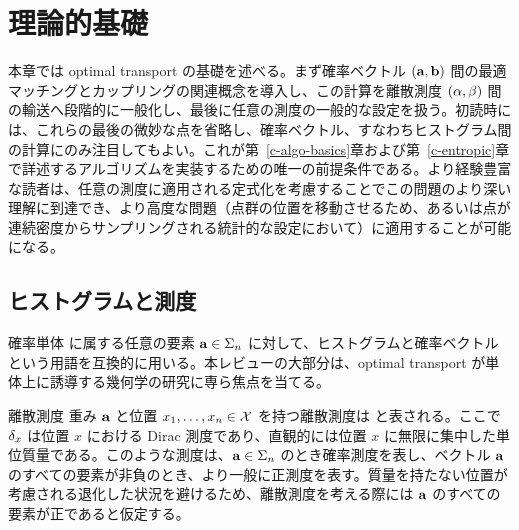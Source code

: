\chapter{理論的基礎}
\label{c-continuous}

本章では optimal transport の基礎を述べる。まず確率ベクトル $(\mathrm{\textbf{a}},\mathrm{\textbf{b}})$ 間の最適マッチングとカップリングの関連概念を導入し、この計算を離散測度 $(\alpha,\beta)$ 間の輸送へ段階的に一般化し、最後に任意の測度の一般的な設定を扱う。初読時には、これらの最後の微妙な点を省略し、確率ベクトル、すなわちヒストグラム間の計算にのみ注目してもよい。これが第~\ref{c-algo-basics}章および第~\ref{c-entropic}章で詳述するアルゴリズムを実装するための唯一の前提条件である。より経験豊富な読者は、任意の測度に適用される定式化を考慮することでこの問題のより深い理解に到達でき、より高度な問題（\eg 点群の位置を移動させるため、あるいは点が連続密度からサンプリングされる統計的な設定において）に適用することが可能になる。

\section{ヒストグラムと測度}

確率単体
に属する任意の要素 $\mathrm{\textbf{a}} \in \Sigma_n$ に対して、ヒストグラムと確率ベクトルという用語を互換的に用いる。本レビューの大部分は、optimal transport が単体上に誘導する幾何学の研究に専ら焦点を当てる。

\begin{rem1}{離散測度}
重み $\mathrm{\textbf{a}}$ と位置 $x_1,\dots,x_n\in\mathcal{X}$ を持つ離散測度は
と表される。ここで $\delta_x$ は位置 $x$ における Dirac 測度であり、直観的には位置 $x$ に無限に集中した単位質量である。このような測度は、$\mathrm{\textbf{a}}\in\Sigma_n$ のとき確率測度を表し、ベクトル $\mathrm{\textbf{a}}$ のすべての要素が非負のとき、より一般に正測度を表す。質量を持たない位置が考慮される退化した状況を避けるため、離散測度を考える際には $\mathrm{\textbf{a}}$ のすべての要素が正であると仮定する。
\end{rem1}



